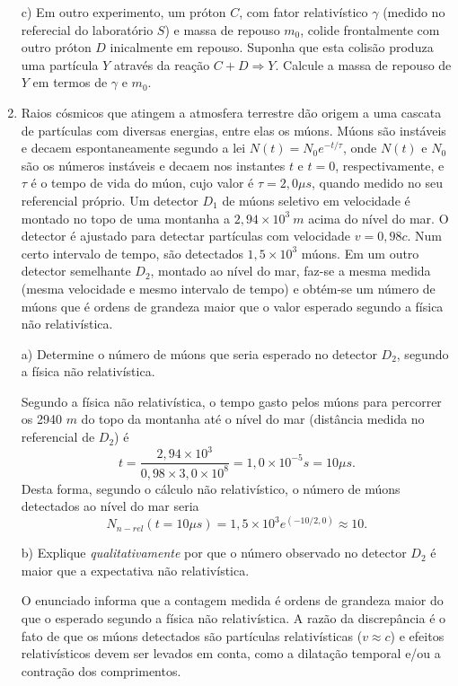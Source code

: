 \begin{enumerate}[start=1,label={\bfseries Q\arabic*.}]
  \resposta

  c) Em outro experimento, um próton $C$, com fator relativístico $\gamma$ (medido no referecial do laboratório $S$) e massa de repouso $m_{0}$, colide frontalmente com outro próton $D$ inicalmente em repouso. Suponha que esta colisão produza uma partícula $Y$ através da reação $C+D \Rightarrow Y$. Calcule a massa de repouso de $Y$ em termos de $\gamma$ e $m_{0}$.

  \resposta



\item Raios cósmicos que atingem a atmosfera terrestre dão origem a uma cascata de partículas com diversas energias, entre elas os múons. Múons são instáveis e decaem espontaneamente segundo a lei $N(t) = N_{0} e^{-t/\tau}$, onde $N(t)$ e $N_{0}$ são os números instáveis e decaem nos instantes $t$ e $t=0$, respectivamente, e $\tau$ é o tempo de vida do múon, cujo valor é $\tau = 2,0\mu s$, quando medido no seu referencial próprio. Um detector $D_{1}$ de múons seletivo em velocidade é montado no topo de uma montanha a $2,94 \times 10^{3}\ m$ acima do nível do mar. O detector é ajustado para detectar partículas com velocidade $v = 0,98c$. Num certo intervalo de tempo, são detectados $1,5 \times 10^{3}$ múons. Em um outro detector semelhante $D_{2}$, montado ao nível do mar, faz-se a mesma medida (mesma velocidade e mesmo intervalo de tempo) e obtém-se um número de múons que é ordens de grandeza maior que o valor esperado segundo a física não relativística.


  a) Determine o número de múons que seria esperado no detector $D_{2}$, segundo a física não relativística.

\resposta Segundo a física não relativística, o tempo gasto pelos múons para percorrer os 2940 $m$ do topo da montanha até o nível do mar (distância medida no referencial de $D_{2}$) é
$$
t = \frac{2,94 \times 10^{3}}{0,98 \times 3,0 \times 10^{8}} = 1,0 \times 10^{-5} s = 10 \mu s.
$$
Desta forma, segundo o cálculo não relativístico, o número de múons detectados ao nível do mar seria
$$
N_{n-rel}(t = 10 \mu s) = 1,5 \times 10^{3} e^{(-10/2,0)} \approx 10.
$$


  b) Explique \textit{qualitativamente} por que o número observado no detector $D_{2}$ é maior que a expectativa não relativística.

\resposta O enunciado informa que a contagem medida é ordens de grandeza maior do que o esperado segundo a física não relativística. A razão da discrepância é o fato de que os múons detectados são partículas relativísticas ($v \approx c$) e efeitos relativísticos devem ser levados em conta, como a
dilatação temporal e/ou a contração dos comprimentos.


\end{enumerate}
